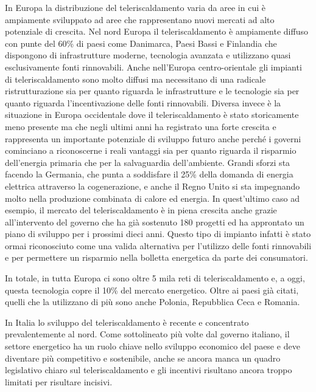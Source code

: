 \documentclass[laurea,oneside,11pt]{USiena_tesiLM}
\begin{document}
In Europa la distribuzione del teleriscaldamento varia da aree in cui è ampiamente sviluppato ad aree che rappresentano nuovi mercati ad alto potenziale di crescita.
Nel nord Europa il teleriscaldamento è ampiamente diffuso con punte del 60\% di paesi come Danimarca, Paesi Bassi e Finlandia che dispongono di infrastrutture moderne, tecnologia avanzata e utilizzano quasi esclusivamente fonti rinnovabili. Anche nell'Europa centro-orientale gli impianti di teleriscaldamento sono molto diffusi ma necessitano di una radicale ristrutturazione sia per quanto riguarda le infrastrutture e le tecnologie sia per quanto riguarda l'incentivazione delle fonti rinnovabili. Diversa invece è la situazione in Europa occidentale dove il teleriscaldamento è stato storicamente meno presente ma che negli ultimi anni ha registrato una forte crescita e rappresenta un importante potenziale di sviluppo futuro anche perché i governi cominciano a riconoscerne i reali vantaggi sia per quanto riguarda il risparmio dell'energia primaria che per la salvaguardia dell'ambiente.
Grandi sforzi sta facendo la Germania, che punta a soddisfare il 25\% della domanda di energia elettrica attraverso la cogenerazione, e anche il Regno Unito si sta impegnando molto nella produzione combinata di calore ed energia.
In quest'ultimo caso ad esempio, il mercato del teleriscaldamento è  in piena crescita anche grazie all'intervento del governo che ha già sostenuto 180 progetti ed ha approntato un piano di sviluppo per i prossimi dieci anni. Questo tipo di impianto infatti è stato ormai riconosciuto come una valida alternativa per l'utilizzo delle fonti rinnovabili e per permettere un risparmio nella bolletta energetica da parte dei consumatori.

In totale, in tutta Europa ci sono oltre 5 mila reti di teleriscaldamento e, a oggi, questa tecnologia copre il 10\% del mercato energetico. Oltre ai paesi già citati, quelli che la utilizzano di più sono anche Polonia, Repubblica Ceca e Romania.

In Italia lo sviluppo del teleriscaldamento è recente e concentrato prevalentemente al nord. Come sottolineato più volte dal governo italiano, il settore energetico ha un ruolo chiave nello sviluppo economico del paese e deve diventare più competitivo e sostenibile, anche se ancora manca un quadro legislativo chiaro sul teleriscaldamento e gli incentivi risultano ancora troppo limitati per risultare incisivi. 
 
\end{document}
